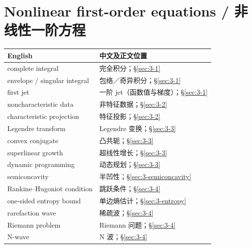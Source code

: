 \section*{Nonlinear first-order equations / 非线性一阶方程}
\begin{center}\small
\begin{tabular}{@{}p{.53\linewidth}p{.38\linewidth}@{}}
\textbf{English}&\textbf{中文及正文位置}\\\hline
complete integral & 完全积分；\S\ref{sec:3-1}\\
envelope / singular integral & 包络／奇异积分；\S\ref{sec:3-1}\\
first jet & 一阶 jet（函数值与梯度）；\S\ref{sec:3-1}\\
noncharacteristic data & 非特征数据；\S\ref{sec:3-2}\\
characteristic projection & 特征投影；\S\ref{sec:3-2}\\
Legendre transform & Legendre 变换；\S\ref{sec:3-3}\\
convex conjugate & 凸共轭；\S\ref{sec:3-3}\\
superlinear growth & 超线性增长；\S\ref{sec:3-3}\\
dynamic programming & 动态规划；\S\ref{sec:3-3}\\
semiconcavity & 半凹性；\S\ref{sec:3-semiconcavity}\\
Rankine--Hugoniot condition & 跳跃条件；\S\ref{sec:3-4}\\
one-sided entropy bound & 单边熵估计；\S\ref{sec:3-entropy}\\
rarefaction wave & 稀疏波；\S\ref{sec:3-4}\\
Riemann problem & Riemann 问题；\S\ref{sec:3-4}\\
N-wave & N 波；\S\ref{sec:3-4}
\end{tabular}
\end{center}


